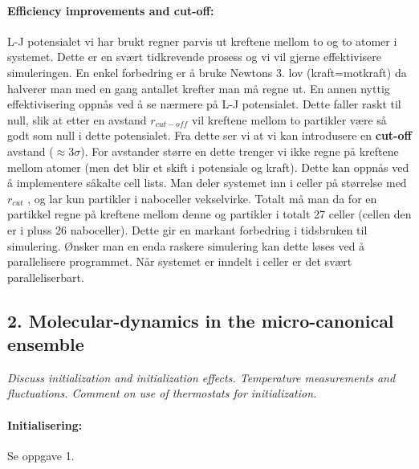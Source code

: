 \documentclass[a4paper,10pt]{article}
\begin{document}
\paragraph{Efficiency improvements and cut-off:} L-J potensialet vi har brukt regner parvis ut kreftene mellom to og to atomer i systemet. Dette er en svært tidkrevende prosess og vi vil gjerne effektivisere simuleringen. En enkel forbedring er å bruke Newtons 3. lov (kraft=motkraft) da halverer man med en gang antallet krefter man må regne ut. En annen nyttig effektivisering oppnås ved å se nærmere på L-J potensialet. Dette faller raskt til null, slik at etter en avstand $r_{cut-off}$ vil kreftene mellom to partikler være så godt som null i dette potensialet. Fra dette ser vi at vi kan introdusere en \textbf{cut-off} avstand ($\approx 3\sigma$). For avstander større en dette trenger vi ikke regne på kreftene mellom atomer (men det blir et skift i potensiale og kraft). Dette kan oppnås ved å implementere såkalte cell lists. Man deler systemet inn i celler på størrelse med $r_{cut}$ , og lar kun partikler i naboceller vekselvirke. Totalt må man da for en partikkel regne på kreftene mellom denne og partikler i totalt 27 celler (cellen den er i pluss 26 naboceller). Dette gir en markant forbedring i tidsbruken til simulering. Ønsker man en enda raskere simulering kan dette løses ved å parallelisere programmet. Når systemet er inndelt i celler er det svært paralleliserbart.


\subsection*{2. Molecular-dynamics in the micro-canonical ensemble}
\textit{Discuss initialization and initialization effects. Temperature measurements and
fluctuations. Comment on use of thermostats for initialization.}

\paragraph{Initialisering:} Se oppgave 1.
\end{document}
